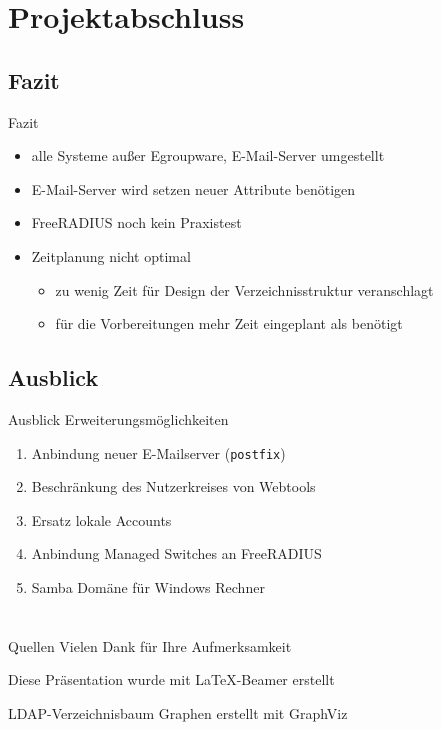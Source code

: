 \documentclass[handout,svgnames]{beamer}
\begin{document}
\section{Projektabschluss}
\subsection{Fazit}
\begin{frame}{Fazit}
\begin{itemize}
	\item alle Systeme außer Egroupware, E-Mail-Server umgestellt
	\item E-Mail-Server wird setzen neuer Attribute benötigen
	\item FreeRADIUS noch kein Praxistest
	\item Zeitplanung nicht optimal
	\begin{itemize}
		\item zu wenig Zeit für Design der Verzeichnisstruktur veranschlagt
		\item für die Vorbereitungen mehr Zeit eingeplant als benötigt
	\end{itemize}
\end{itemize}
\end{frame}


\subsection{Ausblick}
\begin{frame}{Ausblick}
	Erweiterungsmöglichkeiten
	\begin{enumerate}
		\item Anbindung neuer E-Mailserver (\texttt{postfix})
		\item Beschränkung des Nutzerkreises von Webtools
		\item Ersatz lokale Accounts
		\item Anbindung Managed Switches an FreeRADIUS
		\item Samba Domäne für Windows Rechner
	\end{enumerate}
\end{frame}


\section{} %
\begin{frame}{Quellen}
	Vielen Dank für Ihre Aufmerksamkeit
	
	\medskip
	\medskip Diese Präsentation wurde mit \LaTeX{}-Beamer erstellt
	
	LDAP-Verzeichnisbaum Graphen erstellt mit GraphViz
\end{frame}
\end{document}
